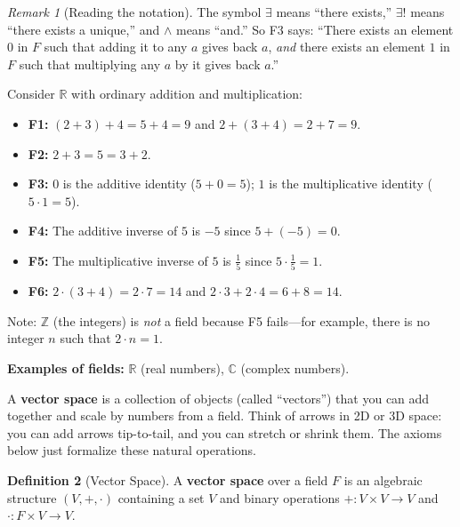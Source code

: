 \documentclass[11pt]{article}
\theoremstyle{definition}
\newtheorem{definition}{Definition}[section]
\theoremstyle{plain}
\theoremstyle{remark}
\newtheorem{remark}[definition]{Remark}
\begin{document}
\begin{remark}[Reading the notation]
The symbol $\exists$ means ``there exists,'' $\exists!$ means ``there exists a unique,'' and $\wedge$ means ``and.'' So F3 says: ``There exists an element $0$ in $F$ such that adding it to any $a$ gives back $a$, \textit{and} there exists an element $1$ in $F$ such that multiplying any $a$ by it gives back $a$.''
\end{remark}

\begin{workedexample}[title=\textbf{Worked Example: Verifying $\mathbb{R}$ is a field}]
Consider $\mathbb{R}$ with ordinary addition and multiplication:
\begin{itemize}[nosep]
  \item \textbf{F1:} $(2 + 3) + 4 = 5 + 4 = 9$ and $2 + (3 + 4) = 2 + 7 = 9$. \checkmark
  \item \textbf{F2:} $2 + 3 = 5 = 3 + 2$. \checkmark
  \item \textbf{F3:} $0$ is the additive identity ($5 + 0 = 5$); $1$ is the multiplicative identity ($5 \cdot 1 = 5$). \checkmark
  \item \textbf{F4:} The additive inverse of $5$ is $-5$ since $5 + (-5) = 0$. \checkmark
  \item \textbf{F5:} The multiplicative inverse of $5$ is $\frac{1}{5}$ since $5 \cdot \frac{1}{5} = 1$. \checkmark
  \item \textbf{F6:} $2 \cdot (3 + 4) = 2 \cdot 7 = 14$ and $2 \cdot 3 + 2 \cdot 4 = 6 + 8 = 14$. \checkmark
\end{itemize}
Note: $\mathbb{Z}$ (the integers) is \textit{not} a field because F5 fails---for example, there is no integer $n$ such that $2 \cdot n = 1$.
\end{workedexample}

\textbf{Examples of fields:} $\mathbb{R}$ (real numbers), $\mathbb{C}$ (complex numbers).

\bigskip

\begin{intuitionbox}
A \textbf{vector space} is a collection of objects (called ``vectors'') that you can add together and scale by numbers from a field. Think of arrows in 2D or 3D space: you can add arrows tip-to-tail, and you can stretch or shrink them. The axioms below just formalize these natural operations.
\end{intuitionbox}

\begin{definition}[Vector Space]
A \textbf{vector space} over a field $F$ is an algebraic structure $(V, +, \cdot)$ containing a set $V$ and binary operations $+ : V \times V \to V$ and $\cdot : F \times V \to V$.
\end{definition}
\end{document}
